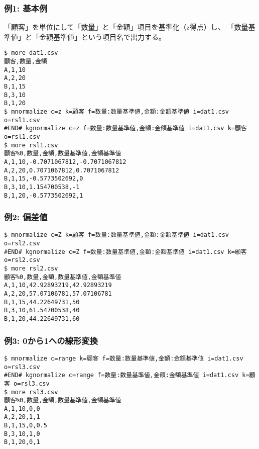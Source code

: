 \subsubsection*{例1: 基本例}

「顧客」を単位にして「数量」と「金額」項目を基準化（z得点）し、
「数量基準値」と「金額基準値」という項目名で出力する。


\begin{Verbatim}[baselinestretch=0.7,frame=single]
$ more dat1.csv
顧客,数量,金額
A,1,10
A,2,20
B,1,15
B,3,10
B,1,20
$ mnormalize c=z k=顧客 f=数量:数量基準値,金額:金額基準値 i=dat1.csv o=rsl1.csv
#END# kgnormalize c=z f=数量:数量基準値,金額:金額基準値 i=dat1.csv k=顧客 o=rsl1.csv
$ more rsl1.csv
顧客%0,数量,金額,数量基準値,金額基準値
A,1,10,-0.7071067812,-0.7071067812
A,2,20,0.7071067812,0.7071067812
B,1,15,-0.5773502692,0
B,3,10,1.154700538,-1
B,1,20,-0.5773502692,1
\end{Verbatim}
\subsubsection*{例2: 偏差値}



\begin{Verbatim}[baselinestretch=0.7,frame=single]
$ mnormalize c=Z k=顧客 f=数量:数量基準値,金額:金額基準値 i=dat1.csv o=rsl2.csv
#END# kgnormalize c=Z f=数量:数量基準値,金額:金額基準値 i=dat1.csv k=顧客 o=rsl2.csv
$ more rsl2.csv
顧客%0,数量,金額,数量基準値,金額基準値
A,1,10,42.92893219,42.92893219
A,2,20,57.07106781,57.07106781
B,1,15,44.22649731,50
B,3,10,61.54700538,40
B,1,20,44.22649731,60
\end{Verbatim}
\subsubsection*{例3: 0から1への線形変換}



\begin{Verbatim}[baselinestretch=0.7,frame=single]
$ mnormalize c=range k=顧客 f=数量:数量基準値,金額:金額基準値 i=dat1.csv o=rsl3.csv
#END# kgnormalize c=range f=数量:数量基準値,金額:金額基準値 i=dat1.csv k=顧客 o=rsl3.csv
$ more rsl3.csv
顧客%0,数量,金額,数量基準値,金額基準値
A,1,10,0,0
A,2,20,1,1
B,1,15,0,0.5
B,3,10,1,0
B,1,20,0,1
\end{Verbatim}
